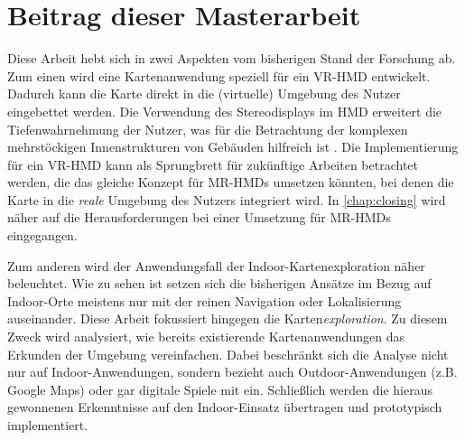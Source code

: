 \section{Beitrag dieser Masterarbeit}
Diese Arbeit hebt sich in zwei Aspekten vom bisherigen Stand der Forschung ab.
Zum einen wird eine Kartenanwendung speziell für ein VR-HMD entwickelt.
Dadurch kann die Karte direkt in die (virtuelle) Umgebung des Nutzer eingebettet werden.
Die Verwendung des Stereodisplays im HMD erweitert die Tiefenwahrnehmung der Nutzer, was für die Betrachtung der komplexen mehrstöckigen Innenstrukturen von Gebäuden hilfreich ist \parencite[vgl.][]{Rantakari2017}.
Die Implementierung für ein VR-HMD kann als Sprungbrett für zukünftige Arbeiten betrachtet werden, die das gleiche Konzept für MR-HMDs umsetzen könnten, bei denen die Karte in die \emph{reale} Umgebung des Nutzers integriert wird.
In \autoref{chap:closing} wird näher auf die Herausforderungen bei einer Umsetzung für MR-HMDs eingegangen.

Zum anderen wird der Anwendungsfall der Indoor-Kartenexploration näher beleuchtet.
Wie zu sehen ist setzen sich die bisherigen Ansätze im Bezug auf Indoor-Orte meistens nur mit der reinen Navigation oder Lokalisierung auseinander.
Diese Arbeit fokussiert hingegen die Karten\emph{exploration}.
Zu diesem Zweck wird analysiert, wie bereits existierende Kartenanwendungen das Erkunden der Umgebung vereinfachen.
Dabei beschränkt sich die Analyse nicht nur auf Indoor-Anwendungen, sondern bezieht auch Outdoor-Anwendungen (z.B. Google Maps) oder gar digitale Spiele mit ein.
Schließlich werden die hieraus gewonnenen Erkenntnisse auf den Indoor-Einsatz übertragen und prototypisch implementiert.
%
\cleardoublepage

